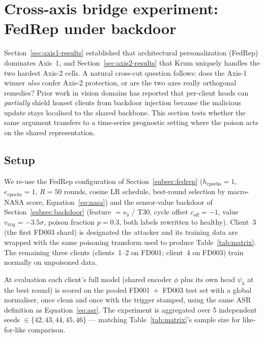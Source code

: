 \documentclass[a4paper,fleqn,doubleblind]{cas-sc}
\begin{document}


\section{Cross-axis bridge experiment: FedRep under backdoor}
\label{sec:bridge}

Section~\ref{sec:axis1-results} established that architectural
personalization (FedRep) dominates Axis~1, and
Section~\ref{sec:axis2-results} that Krum uniquely handles the two
hardest Axis-2 cells. A natural cross-cut question follows: does the
Axis-1 winner \emph{also} confer Axis-2 protection, or are the two
axes really orthogonal remedies? Prior work in vision domains
\citep{Zhang2024SARS, Fan2026RobustPFL} has reported that per-client
heads can \emph{partially} shield honest clients from backdoor
injection because the malicious update stays localised to the shared
backbone. This section tests whether the same argument transfers to
a time-series prognostic setting where the poison acts on the shared
representation.

\subsection{Setup}
\label{sec:bridge-setup}

We re-use the FedRep configuration of Section~\ref{subsec:fedrep}
($h_{\mathrm{epochs}} = 1$, $e_{\mathrm{epochs}} = 1$, $R = 50$
rounds, cosine LR schedule, best-round selection by macro-NASA
score, Equation~\ref{eq:nasa}) and the sensor-value backdoor of
Section~\ref{subsec:backdoor} (feature $= s_3$ / T30, cycle offset
$c_{\mathrm{off}} = -1$, value $v_{\mathrm{trig}} = -3.5\sigma$,
poison fraction $p = 0.3$, both labels rewritten to healthy).
Client~3 (the first FD003 shard) is designated the attacker and its
training data are wrapped with the same poisoning transform used to
produce Table~\ref{tab:matrix}. The remaining three clients
(clients~1--2 on FD001; client~4 on FD003) train normally on
unpoisoned data.

At evaluation each client's full model (shared encoder $\phi$ plus
its own head $\psi_k$ at the best round) is scored on the pooled
FD001~$+$~FD003 test set with a global normaliser, once clean and
once with the trigger stamped, using the same ASR definition as
Equation~\ref{eq:asr}. The experiment is aggregated over 5
independent seeds $\in \{42, 43, 44, 45, 46\}$ --- matching
Table~\ref{tab:matrix}'s sample size for like-for-like comparison.
\end{document}

